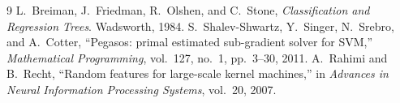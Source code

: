 \documentclass[10pt,twocolumn,a4paper]{article}
\begin{document}
\begin{thebibliography}{9}
L.~Breiman, J.~Friedman, R.~Olshen, and C.~Stone,
\emph{Classification and Regression Trees}.
Wadsworth, 1984.
S.~Shalev-Shwartz, Y.~Singer, N.~Srebro, and A.~Cotter,
``Pegasos: primal estimated sub-gradient solver for SVM,''
\emph{Mathematical Programming}, vol.~127, no.~1, pp.~3--30, 2011.
A.~Rahimi and B.~Recht,
``Random features for large-scale kernel machines,''
in \emph{Advances in Neural Information Processing Systems}, vol.~20, 2007.
\end{thebibliography}
\end{document}
